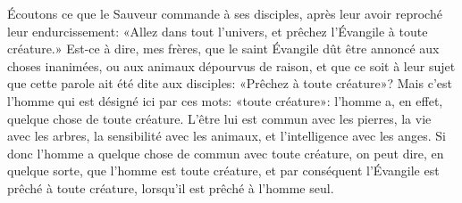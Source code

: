 Écoutons ce que le Sauveur commande à ses disciples,
	après leur avoir reproché leur endurcissement:
	«Allez dans tout l’univers, et prêchez l’Évangile à toute créature.»
Est-ce à dire, mes frères,
	que le saint Évangile dût être annoncé aux choses inanimées,
	ou aux animaux dépourvus de raison,
	et que ce soit à leur sujet que cette parole ait été dite aux disciples:
	«Prêchez à toute créature»?
Mais c’est l’homme qui est désigné ici par ces mots: «toute créature»:
	l’homme a, en effet, quelque chose de toute créature.
L’être lui est commun avec les pierres, la vie avec les arbres,
	la sensibilité avec les animaux, et l’intelligence avec les anges.
Si donc l’homme a quelque chose de commun avec toute créature,
	on peut dire, en quelque sorte, que l’homme est toute créature,
	et par conséquent l’Évangile est prêché à toute créature,
	lorsqu’il est prêché à l’homme seul.
